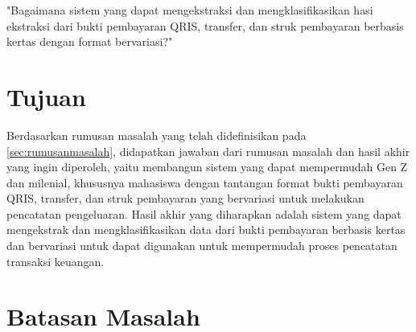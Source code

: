 \begin{center}
	"Bagaimana sistem yang dapat mengekstraksi dan mengklasifikasikan hasi ekstraksi dari bukti pembayaran QRIS, transfer, dan struk pembayaran berbasis kertas dengan format bervariasi?"
\end{center}

\section{Tujuan}
\label{sec:tujuan}

Berdasarkan rumusan masalah yang telah didefinisikan pada \autoref{sec:rumusanmasalah}, didapatkan jawaban dari rumusan masalah dan hasil akhir yang ingin diperoleh, yaitu membangun sistem yang dapat mempermudah Gen Z dan milenial, khususnya mahasiswa dengan tantangan format bukti pembayaran QRIS, transfer, dan struk pembayaran yang bervariasi untuk melakukan pencatatan pengeluaran. Hasil akhir yang diharapkan adalah sistem yang dapat mengekstrak dan mengklasifikasikan data dari bukti pembayaran berbasis kertas dan bervariasi untuk dapat digunakan untuk mempermudah proses pencatatan transaksi keuangan.

\section{Batasan Masalah}
\label{sec:batasanmasalah}

